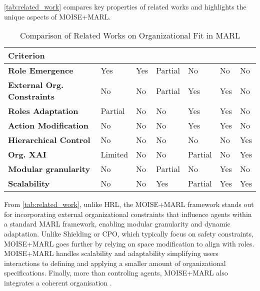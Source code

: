 \documentclass[sigconf,anonymous]{aamas}
\begin{document}
\autoref{tab:related_work} compares key properties of related works and highlights the unique aspects of MOISE+MARL.

\begin{table}[ht]
    \centering
    \small
    \renewcommand{\arraystretch}{1.3}
    \caption{Comparison of Related Works on Organizational Fit in MARL}
    \label{tab:related_work}
    \begin{tabular}{m{2.1cm} >{\centering\arraybackslash}m{0.8cm} >{\centering\arraybackslash}m{0.5cm} >{\centering\arraybackslash}m{0.8cm} >{\centering\arraybackslash}m{0.5cm} >{\centering\arraybackslash}m{0.5cm} >{\centering\arraybackslash}m{0.8cm}}
        \textbf{Criterion} & \textbf{\cite{yang2021role}} & \textbf{\cite{grover2018role}} & \textbf{\cite{borsa2019constrained}} & \textbf{\cite{achiam2017cpo}} & \textbf{\cite{ray2019benchmarking}} & \textbf{\cite{ghavamzadeh2006hrl}} \\
        \hline \vspace{0.2cm}
        \textbf{Role Emergence} & Yes & Yes & Partial & No & No & No \\
        \textbf{External Org. \newline Constraints} & No & No & Partial & Yes & Yes & No \\
        \textbf{Roles \newline Adaptation} & Partial & No & No & Yes & Yes & No \\
        \textbf{Action \newline Modification} & No & No & No & Yes & Yes & No \\
        \textbf{Hierarchical \newline Control} & No & No & No & No & No & Yes \\
        \textbf{Org. XAI} & Limited & No & No & Partial & No & Yes \\
        \textbf{Modular \newline granularity} & No & No & Partial & No & Yes & No \\
        \textbf{Scalability} & No & No & Yes & Partial & Yes & Yes
    \end{tabular}
\end{table}
%
\noindent From \autoref{tab:related_work}, unlike HRL, the MOISE+MARL framework stands out for incorporating external organizational constraints that influence agents within a standard MARL framework, enabling modular granularity and dynamic adaptation. Unlike Shielding or CPO, which typically focus on safety constraints, MOISE+MARL goes further by relying on space modification to align with roles. MOISE+MARL handles scalability and adaptability simplifying users interactions to defining and applying a smaller amount of organizational specifications. Finally, more than controling agents, MOISE+MARL also integrates a coherent organisation .
\end{document}
